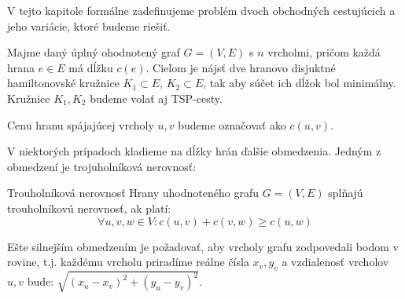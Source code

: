 V tejto kapitole formálne zadefinujeme problém dvoch obchodných cestujúcich
a jeho variácie, ktoré budeme riešiť.

\begin{definicia}
Majme daný úplný ohodnotený graf $G = (V, E)$ s $n$ vrcholmi, pričom každá hrana
$e \in E$ má dĺžku $c(e)$. Cieľom je nájsť dve hranovo disjuktné hamiltonovské kružnice
$K_1 \subset E$, $K_2 \subset E$, tak aby súčet ich dĺžok bol minimálny.
Kružnice $K_1, K_2$ budeme volať aj TSP-cesty.
\end{definicia}

\begin{poznamka}
Cenu hranu spájajúcej vrcholy $u, v$ budeme označovať ako $c(u, v)$. 
\end{poznamka}

V niektorých prípadoch kladieme na dĺžky hrán ďalšie obmedzenia.
Jedným z obmedzení je trojuholníková nerovnosť:

\begin{definicia}{Trouholníková nerovnosť}
Hrany uhodnoteného grafu $G = (V, E)$ splňajú trouholníkovú nerovnosť, ak platí:
$$\forall u,v,w \in V: c(u,v) + c(v,w) \geq c(u,w)$$
\end{definicia}

Ešte silnejším obmedzením je požadovať, aby vrcholy grafu zodpovedali bodom v rovine, t.j.
každému vrcholu priradíme reálne čísla $x_v, y_v$ a vzdialenosť vrcholov $u, v$ bude:
$\sqrt{(x_u - x_v)^2 + (y_u - y_v)^2}$.
